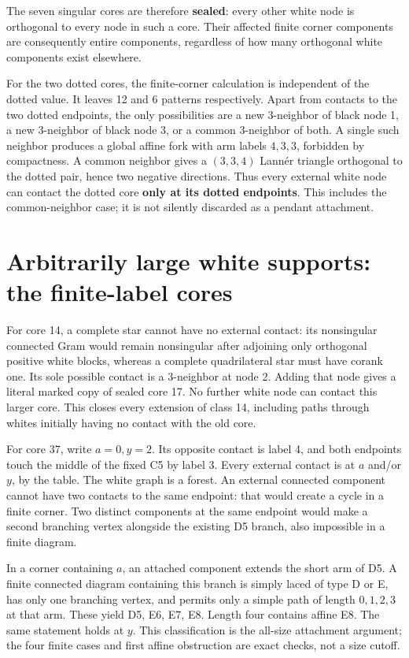 \documentclass[
  10pt,
]{report}
\begin{document}
The seven singular cores are therefore \textbf{sealed}: every other
white node is orthogonal to every node in such a core. Their affected
finite corner components are consequently entire components, regardless
of how many orthogonal white components exist elsewhere.

For the two dotted cores, the finite-corner calculation is independent
of the dotted value. It leaves 12 and 6 patterns respectively. Apart
from contacts to the two dotted endpoints, the only possibilities are a
new 3-neighbor of black node 1, a new 3-neighbor of black node 3, or a
common 3-neighbor of both. A single such neighbor produces a global
affine fork with arm labels \(4,3,3\), forbidden by compactness. A
common neighbor gives a \((3,3,4)\) Lannér triangle orthogonal to the
dotted pair, hence two negative directions. Thus every external white
node can contact the dotted core \textbf{only at its dotted endpoints}.
This includes the common-neighbor case; it is not silently discarded as
a pendant attachment.

\section{Arbitrarily large white supports: the finite-label
cores}\label{arbitrarily-large-white-supports-the-finite-label-cores}

For core 14, a complete star cannot have no external contact: its
nonsingular connected Gram would remain nonsingular after adjoining only
orthogonal positive white blocks, whereas a complete quadrilateral star
must have corank one. Its sole possible contact is a 3-neighbor at node
2. Adding that node gives a literal marked copy of sealed core 17. No
further white node can contact this larger core. This closes every
extension of class 14, including paths through whites initially having
no contact with the old core.

For core 37, write \(a=0,y=2\). Its opposite contact is label 4, and
both endpoints touch the middle of the fixed C5 by label 3. Every
external contact is at \(a\) and/or \(y\), by the table. The white graph
is a forest. An external connected component cannot have two contacts to
the same endpoint: that would create a cycle in a finite corner. Two
distinct components at the same endpoint would make a second branching
vertex alongside the existing D5 branch, also impossible in a finite
diagram.

In a corner containing \(a\), an attached component extends the short
arm of D5. A finite connected diagram containing this branch is simply
laced of type D or E, has only one branching vertex, and permits only a
simple path of length \(0,1,2,3\) at that arm. These yield D5, E6, E7,
E8. Length four contains affine E8. The same statement holds at \(y\).
This classification is the all-size attachment argument; the four finite
cases and first affine obstruction are exact checks, not a size cutoff.
\end{document}

